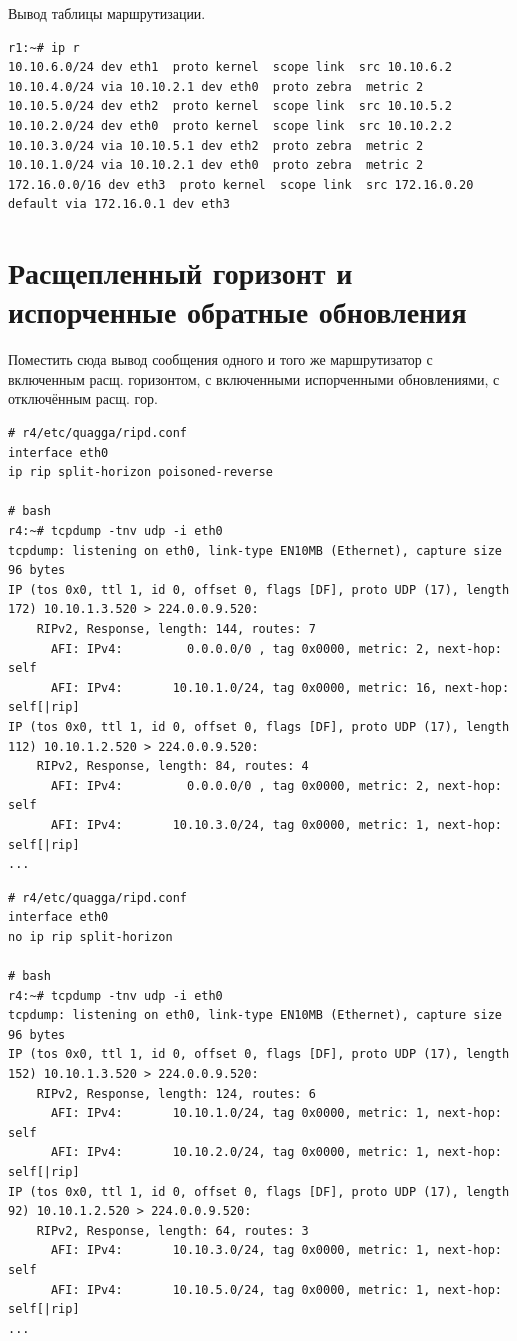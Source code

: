 \documentclass[a4paper,12pt]{article}
\begin{document}
Вывод таблицы маршрутизации.

\begin{Verbatim}
r1:~# ip r
10.10.6.0/24 dev eth1  proto kernel  scope link  src 10.10.6.2 
10.10.4.0/24 via 10.10.2.1 dev eth0  proto zebra  metric 2 
10.10.5.0/24 dev eth2  proto kernel  scope link  src 10.10.5.2 
10.10.2.0/24 dev eth0  proto kernel  scope link  src 10.10.2.2 
10.10.3.0/24 via 10.10.5.1 dev eth2  proto zebra  metric 2 
10.10.1.0/24 via 10.10.2.1 dev eth0  proto zebra  metric 2 
172.16.0.0/16 dev eth3  proto kernel  scope link  src 172.16.0.20 
default via 172.16.0.1 dev eth3 
\end{Verbatim}


\section{Расщепленный горизонт и испорченные обратные обновления}

Поместить сюда вывод сообщения одного и того же маршрутизатор с включенным расщ. горизонтом, с включенными испорченными обновлениями, с отключённым расщ. гор.

\begin{Verbatim}
# r4/etc/quagga/ripd.conf
interface eth0
ip rip split-horizon poisoned-reverse

# bash
r4:~# tcpdump -tnv udp -i eth0
tcpdump: listening on eth0, link-type EN10MB (Ethernet), capture size 96 bytes
IP (tos 0x0, ttl 1, id 0, offset 0, flags [DF], proto UDP (17), length 172) 10.10.1.3.520 > 224.0.0.9.520: 
	RIPv2, Response, length: 144, routes: 7
	  AFI: IPv4:         0.0.0.0/0 , tag 0x0000, metric: 2, next-hop: self
	  AFI: IPv4:       10.10.1.0/24, tag 0x0000, metric: 16, next-hop: self[|rip]
IP (tos 0x0, ttl 1, id 0, offset 0, flags [DF], proto UDP (17), length 112) 10.10.1.2.520 > 224.0.0.9.520: 
	RIPv2, Response, length: 84, routes: 4
	  AFI: IPv4:         0.0.0.0/0 , tag 0x0000, metric: 2, next-hop: self
	  AFI: IPv4:       10.10.3.0/24, tag 0x0000, metric: 1, next-hop: self[|rip]
...
\end{Verbatim}

\begin{Verbatim}
# r4/etc/quagga/ripd.conf
interface eth0
no ip rip split-horizon

# bash
r4:~# tcpdump -tnv udp -i eth0
tcpdump: listening on eth0, link-type EN10MB (Ethernet), capture size 96 bytes
IP (tos 0x0, ttl 1, id 0, offset 0, flags [DF], proto UDP (17), length 152) 10.10.1.3.520 > 224.0.0.9.520: 
	RIPv2, Response, length: 124, routes: 6
	  AFI: IPv4:       10.10.1.0/24, tag 0x0000, metric: 1, next-hop: self
	  AFI: IPv4:       10.10.2.0/24, tag 0x0000, metric: 1, next-hop: self[|rip]
IP (tos 0x0, ttl 1, id 0, offset 0, flags [DF], proto UDP (17), length 92) 10.10.1.2.520 > 224.0.0.9.520: 
	RIPv2, Response, length: 64, routes: 3
	  AFI: IPv4:       10.10.3.0/24, tag 0x0000, metric: 1, next-hop: self
	  AFI: IPv4:       10.10.5.0/24, tag 0x0000, metric: 1, next-hop: self[|rip]
...
\end{Verbatim}
\end{document}

